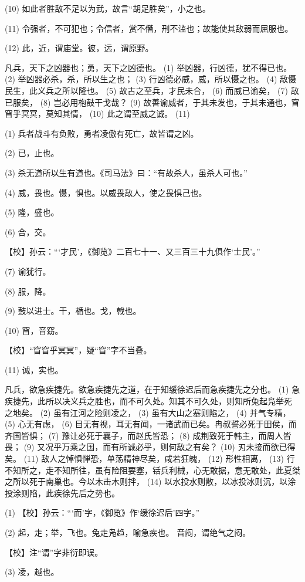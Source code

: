 \documentclass[12pt,UTF8]{ctexbook}
\begin{document}
(10) 如此者胜敌不足以为武，故言“胡足胜矣”，小之也。

(11) 令强者，不可犯也；令信者，赏不僭，刑不滥也；故能使其敌弱而屈服也。

(12) 此，近，谓庙堂。彼，远，谓原野。

凡兵，天下之凶器也；勇，天下之凶德也。 (1) 举凶器，行凶德，犹不得已也。 (2) 举凶器必杀，杀，所以生之也； (3) 行凶德必威，威，所以慑之也。 (4) 敌慑民生，此义兵之所以隆也。 (5) 故古之至兵，才民未合， (6) 而威已谕矣， (7) 敌已服矣， (8) 岂必用枹鼓干戈哉？ (9) 故善谕威者，于其未发也，于其未通也，窅窅乎冥冥，莫知其情， (10) 此之谓至威之诚。 (11)

(1) 兵者战斗有负败，勇者凌傲有死亡，故皆谓之凶。

(2) 已，止也。

(3) 杀无道所以生有道也。《司马法》曰：“有故杀人，虽杀人可也。”

(4) 威，畏也。慑，惧也。以威畏敌人，使之畏惧己也。

(5) 隆，盛也。

(6) 合，交。

【校】孙云：“‘才民’，《御览》二百七十一、又三百三十九俱作‘士民’。”

(7) 谕犹行。

(8) 服，降。

(9) 鼓以进士。干，楯也。戈，戟也。

(10) 窅，音窈。

【校】“窅窅乎冥冥”，疑“窅”字不当叠。

(11) 诚，实也。

凡兵，欲急疾捷先。欲急疾捷先之道，在于知缓徐迟后而急疾捷先之分也。 (1) 急疾捷先，此所以决义兵之胜也，而不可久处。知其不可久处，则知所兔起凫举死 之地矣。 (2) 虽有江河之险则凌之， (3) 虽有大山之塞则陷之， (4) 并气专精， (5) 心无有虑， (6) 目无有视，耳无有闻，一诸武而已矣。冉叔誓必死于田侯，而齐国皆惧； (7) 豫让必死于襄子，而赵氏皆恐； (8) 成荆致死于韩主，而周人皆畏； (9) 又况乎万乘之国，而有所诚必乎，则何敌之有矣？ (10) 刃未接而欲已得矣。 (11) 敌人之悼惧惮恐，单荡精神尽矣，咸若狂魄， (12) 形性相离， (13) 行不知所之，走不知所往，虽有险阻要塞，铦兵利械，心无敢据，意无敢处，此夏桀之所以死于南巢也。今以木击木则拌， (14) 以水投水则散，以冰投冰则沉，以涂投涂则陷，此疾徐先后之势也。

(1) 【校】孙云：“‘而’字，《御览》作‘缓徐迟后’四字。”

(2) 起，走；举，飞也。兔走凫趋，喻急疾也。 音闷，谓绝气之闷。

【校】注“谓”字非衍即误。

(3) 凌，越也。
\end{document}
